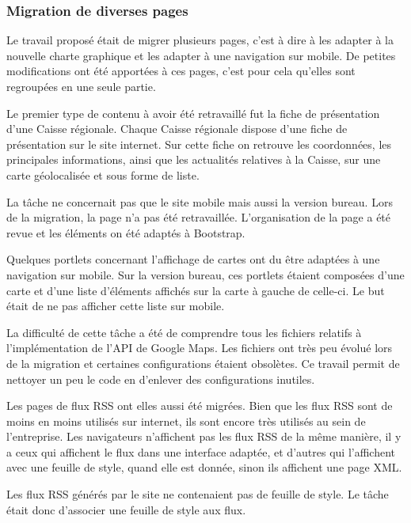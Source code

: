 \documentclass[12pt,a4paper]{article}
\begin{document}
\subsubsection{Migration de diverses pages}
Le travail proposé était de migrer plusieurs pages, c'est à dire à les adapter à la nouvelle charte graphique et les adapter à une navigation sur mobile. De petites modifications ont été apportées à ces pages, c'est pour cela qu'elles sont regroupées en une seule partie.\par 
\bigskip
Le premier type de contenu à avoir été retravaillé fut la fiche de présentation d'une Caisse régionale. Chaque Caisse régionale dispose d'une fiche de présentation sur le site internet. Sur cette fiche on retrouve les coordonnées, les principales informations, ainsi que les actualités relatives à la Caisse, sur une carte géolocalisée et sous forme de liste.\par 
La tâche ne concernait pas que le site mobile mais aussi la version bureau. Lors de la migration, la page n'a pas été retravaillée. L'organisation de la page a été revue et les éléments on été adaptés à Bootstrap.\par 
\bigskip
Quelques portlets concernant l'affichage de cartes ont du être adaptées à une navigation sur mobile. Sur la version bureau, ces portlets étaient composées d'une carte et d'une liste d'éléments affichés sur la carte à gauche de celle-ci. Le but était de ne pas afficher cette liste sur mobile.\par 
La difficulté de cette tâche a été de comprendre tous les fichiers relatifs à l'implémentation de l'API de Google Maps. Les fichiers ont très peu évolué lors de la migration et certaines configurations étaient obsolètes. Ce travail permit de nettoyer un peu le code en d'enlever des configurations inutiles.\par
\bigskip
Les pages de flux RSS ont elles aussi été migrées. Bien que les flux RSS sont de moins en moins utilisés sur internet, ils sont encore très utilisés au sein de l'entreprise. Les navigateurs n'affichent pas les flux RSS de la même manière, il y a ceux qui affichent le flux dans une interface adaptée, et d'autres qui l'affichent avec une feuille de style, quand elle est donnée, sinon ils affichent une page XML.\par 
Les flux RSS générés par le site ne contenaient pas de feuille de style. Le tâche était donc d'associer une feuille de style aux flux.\par
\end{document}
